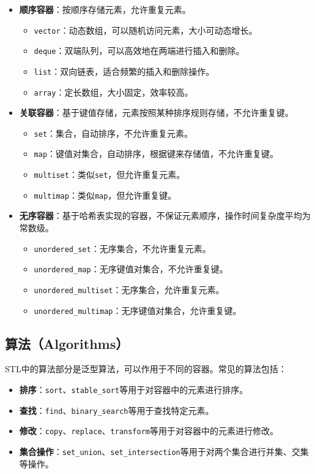\documentclass{article}
\begin{document}
\begin{itemize}
    \item \textbf{顺序容器}：按顺序存储元素，允许重复元素。
    \begin{itemize}
        \item \texttt{vector}：动态数组，可以随机访问元素，大小可动态增长。
        \item \texttt{deque}：双端队列，可以高效地在两端进行插入和删除。
        \item \texttt{list}：双向链表，适合频繁的插入和删除操作。
        \item \texttt{array}：定长数组，大小固定，效率较高。
    \end{itemize}
    
    \item \textbf{关联容器}：基于键值存储，元素按照某种排序规则存储，不允许重复键。
    \begin{itemize}
        \item \texttt{set}：集合，自动排序，不允许重复元素。
        \item \texttt{map}：键值对集合，自动排序，根据键来存储值，不允许重复键。
        \item \texttt{multiset}：类似\texttt{set}，但允许重复元素。
        \item \texttt{multimap}：类似\texttt{map}，但允许重复键。
    \end{itemize}
    
    \item \textbf{无序容器}：基于哈希表实现的容器，不保证元素顺序，操作时间复杂度平均为常数级。
    \begin{itemize}
        \item \texttt{unordered\_set}：无序集合，不允许重复元素。
        \item \texttt{unordered\_map}：无序键值对集合，不允许重复键。
        \item \texttt{unordered\_multiset}：无序集合，允许重复元素。
        \item \texttt{unordered\_multimap}：无序键值对集合，允许重复键。
    \end{itemize}
\end{itemize}

\subsection{算法（Algorithms）}
STL中的算法部分是泛型算法，可以作用于不同的容器。常见的算法包括：

\begin{itemize}
    \item \textbf{排序}：\texttt{sort}、\texttt{stable\_sort}等用于对容器中的元素进行排序。
    \item \textbf{查找}：\texttt{find}、\texttt{binary\_search}等用于查找特定元素。
    \item \textbf{修改}：\texttt{copy}、\texttt{replace}、\texttt{transform}等用于对容器中的元素进行修改。
    \item \textbf{集合操作}：\texttt{set\_union}、\texttt{set\_intersection}等用于对两个集合进行并集、交集等操作。
\end{itemize}
\end{document}
